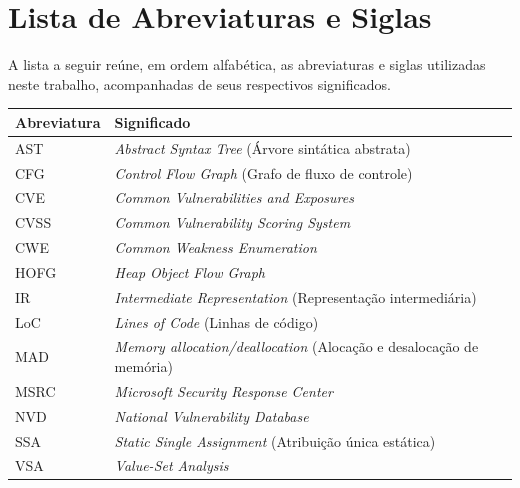 \documentclass[
    12pt,                %
    openright,           %
    oneside,             %
    a4paper,             %
    english,             %
    brazil               %
]{abntex2}
\begin{document}
\listoffigures*
\cleardoublepage


\chapter*{Lista de Abreviaturas e Siglas}

\noindent A lista a seguir reúne, em ordem alfabética, as abreviaturas e siglas utilizadas neste trabalho, acompanhadas de seus respectivos significados.

\vspace{\onelineskip}

\begin{center}
\begin{tabular}{@{}p{3.2cm}p{}@{}}
\toprule
\textbf{Abreviatura} & \textbf{Significado} \\
\midrule
AST & \textit{Abstract Syntax Tree} (Árvore sintática abstrata) \\
CFG & \textit{Control Flow Graph} (Grafo de fluxo de controle) \\
CVE & \textit{Common Vulnerabilities and Exposures} \\
CVSS & \textit{Common Vulnerability Scoring System} \\
CWE & \textit{Common Weakness Enumeration} \\
HOFG & \textit{Heap Object Flow Graph} \\
IR & \textit{Intermediate Representation} (Representação intermediária) \\
LoC & \textit{Lines of Code} (Linhas de código) \\
MAD & \textit{Memory allocation/deallocation} (Alocação e desalocação de memória) \\
MSRC & \textit{Microsoft Security Response Center} \\
NVD & \textit{National Vulnerability Database} \\
SSA & \textit{Static Single Assignment} (Atribuição única estática)\\
VSA & \textit{Value-Set Analysis} \\
\bottomrule
\end{tabular}
\end{center}
\end{document}
